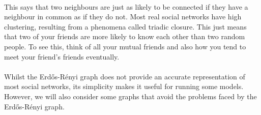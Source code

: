 \\
This says that two neighbours are just as likely to be connected if they have a neighbour in common as if they do not. Most real social networks have high clustering, resulting from a phenomena called triadic closure\cite{simmel}\cite{strength-weak}. This just means that two of your friends are more likely to know each other than two random people. To see this, think of all your mutual friends and also how you tend to meet your friend's friends eventually.\\
\\
Whilst the Erd\H{o}s-R{\'e}nyi graph does not provide an accurate representation of most social networks, its simplicity makes it useful for running some models. However, we will also consider some graphs that avoid the problems faced by the Erd\H{o}s-R{\'e}nyi graph.
